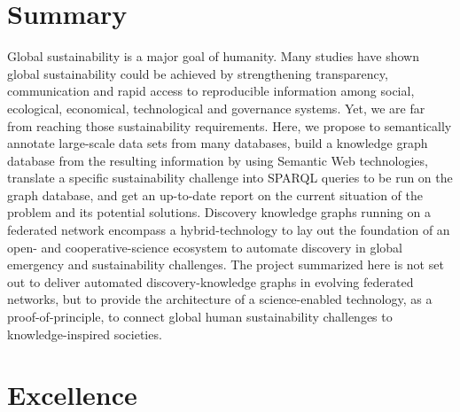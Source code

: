 \documentclass[11pt, a4paper]{article} %
\begin{document}
\section*{{\bf Summary}} Global sustainability is a major goal of
humanity. Many studies have shown global sustainability could be
achieved by strengthening transparency, 
communication
and rapid access to
reproducible information among social, ecological, economical,
technological and governance systems.
Yet, we are far from reaching those sustainability requirements.
Here, we propose to semantically annotate large-scale data sets from many databases, build a knowledge graph database from the resulting information by using Semantic Web technologies, translate a specific sustainability challenge into SPARQL queries to be run on the graph database, and get an up-to-date report on the current situation of the problem and its potential solutions.
Discovery knowledge graphs running on a
federated network encompass a hybrid-technology to lay out the
foundation of an open- and cooperative-science ecosystem to automate
discovery in global emergency and sustainability challenges. The
project summarized here is not set out to deliver automated
discovery-knowledge graphs in evolving federated networks, but to
provide the architecture of a science-enabled technology, as a
proof-of-principle, to connect global human sustainability challenges
to knowledge-inspired societies.
\section{Excellence}
\end{document}
